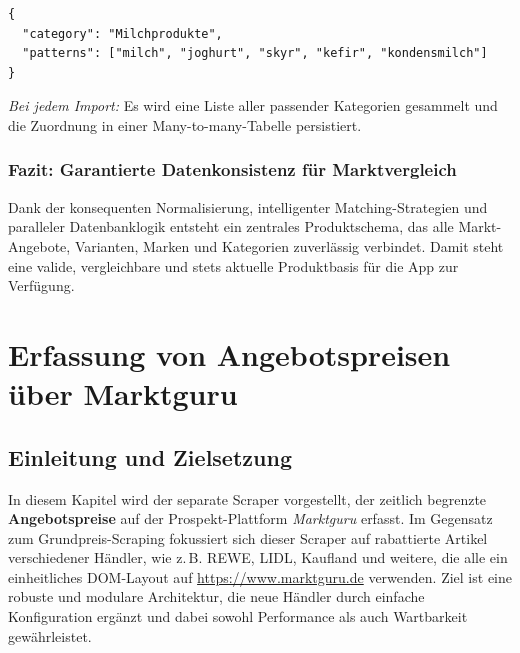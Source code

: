 \documentclass[12pt, a4paper]{report} %
\newcommand{\authorinitials}{} %
\begin{document}
\begin{lstlisting}[style=typescriptstyle, caption={Beispielstruktur: Kategorie-Definitionen als JSON}]
{
  "category": "Milchprodukte",
  "patterns": ["milch", "joghurt", "skyr", "kefir", "kondensmilch"]
}
\end{lstlisting}

\emph{Bei jedem Import:} Es wird eine Liste aller passender Kategorien gesammelt und die Zuordnung in einer Many-to-many-Tabelle persistiert.

\subsection{Fazit: Garantierte Datenkonsistenz für Marktvergleich}

Dank der konsequenten Normalisierung, intelligenter Matching-Strategien und paralleler Datenbanklogik entsteht ein zentrales Produktschema, das alle Markt-Angebote, Varianten, Marken und Kategorien zuverlässig verbindet. Damit steht eine valide, vergleichbare und stets aktuelle Produktbasis für die App zur Verfügung.

\cleardoublepage

\chapter{Erfassung von Angebotspreisen über Marktguru}
\renewcommand{\authorinitials}{DH}
\label{chap:marktguru_scraping}

\section{Einleitung und Zielsetzung}
In diesem Kapitel wird der separate Scraper vorgestellt, der zeitlich begrenzte \textbf{Angebotspreise} auf der Prospekt-Plattform \textit{Marktguru} erfasst. Im Gegensatz zum Grundpreis-Scraping fokussiert sich dieser Scraper auf rabattierte Artikel verschiedener Händler, wie z.\,B. REWE, LIDL, Kaufland und weitere, die alle ein einheitliches DOM-Layout auf \url{https://www.marktguru.de} verwenden. Ziel ist eine robuste und modulare Architektur, die neue Händler durch einfache Konfiguration ergänzt und dabei sowohl Performance als auch Wartbarkeit gewährleistet.
\end{document}
